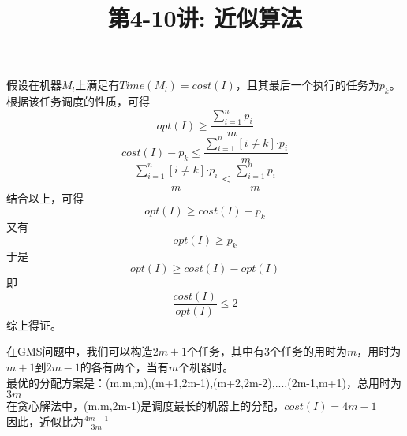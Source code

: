 \documentclass[a4paper, justified]{tufte-handout}
\title{第4-10讲: 近似算法}
\date{\zhtoday} %
\begin{document}
\maketitle
\noplagiarism %
\begin{abstract}
\end{abstract}
\beginrequired

\begin{problem}[JH 4.2.1.4]
\end{problem}

\begin{solution}
  假设在机器$M_l$上满足有$Time(M_l)=cost(I)$，且其最后一个执行的任务为$p_k$。\\
  根据该任务调度的性质，可得
  \[
    opt(I)\geq\frac{\sum_{i=1}^{n}p_i}{m}
  \]
  \[
    cost(I)-p_k\leq\frac{\sum_{i=1}^{n}[i \neq k]\text{·}p_i}{m}
  \]
  \[
    \frac{\sum_{i=1}^{n}[i \neq k]\text{·}p_i}{m}\leq \frac{\sum_{i=1}^{n}p_i}{m}
  \]
  结合以上，可得
  \[
    opt(I)\geq cost(I) - p_k
  \]
  又有
  \[
    opt(I)\geq p_k
  \]
  于是
  \[
    opt(I)\geq cost(I) - opt(I)
  \]
  即
  \[
    \frac{cost(I)}{opt(I)}\leq 2
  \]
  综上得证。
\end{solution}

\begin{problem}[JH 4.2.1.5]
\end{problem}

\begin{solution}
  在GMS问题中，我们可以构造$2m+1$个任务，其中有3个任务的用时为$m$，用时为$m+1$到$2m-1$的各有两个，当有$m$个机器时。\\
  最优的分配方案是：(m,m,m),(m+1,2m-1),(m+2,2m-2),...,(2m-1,m+1)，总用时为$3m$\\
  在贪心解法中，(m,m,2m-1)是调度最长的机器上的分配，$cost(I)=4m-1$\\
  因此，近似比为$\frac{4m-1}{3m}$
\end{solution}

\begin{problem}[JH 4.2.3.3]
\end{problem}
\end{document}
